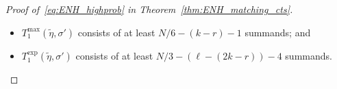 \documentclass[11pt]{article}
\numberwithin{equation}{section}
\newcommand{\wt}{\widetilde} %
\theoremstyle{definition}
\begin{document}
\begin{proof}[Proof of~\eqref{eq:ENH_highprob} in Theorem~\ref{thm:ENH_matching_cts}]
\begin{itemize}

\item $T_{1}^{\max}(\wt{\eta}, \sigma')$ consists of at least $N/6 - (k-r) - 1$ summands; 
and 


\item $T_{1}^{\exp}(\wt{\eta}, \sigma')$ consists of at least $N/3 - (\ell - (2k-r)) - 4$ summands. 


\end{itemize}



\end{proof}
\end{document}
